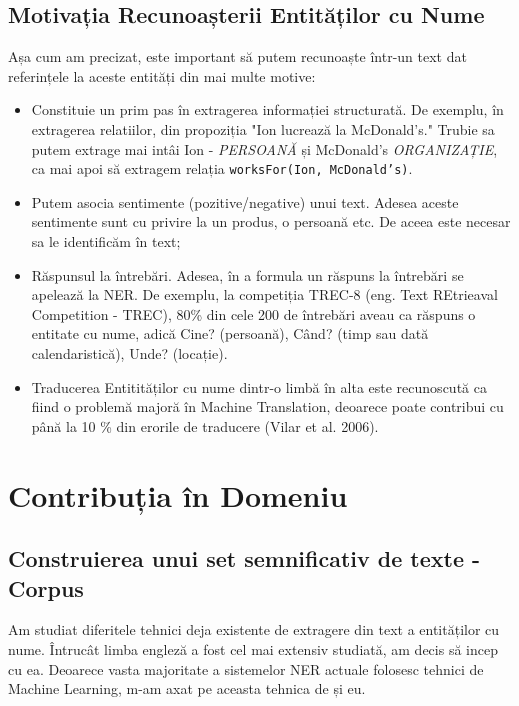 \subsection{Motivația Recunoașterii Entităților cu Nume}

Așa cum am precizat, este important să putem recunoaște într-un text dat referințele la aceste entități din mai multe motive:

\begin{itemize}
\item Constituie un prim pas în extragerea informației structurată. De exemplu, în extragerea relatiilor, din propoziția "Ion lucrează la McDonald's." Trubie sa putem extrage mai intâi Ion - \textit{PERSOANĂ} și McDonald's \textit{ORGANIZAȚIE}, ca mai apoi să extragem relația \texttt{worksFor(Ion, McDonald's)}.
\item Putem asocia sentimente (pozitive/negative) unui text. Adesea aceste sentimente sunt cu privire la un produs, o persoană etc. De aceea este necesar sa le identificăm în text;
\item Răspunsul la întrebări. Adesea, în a formula un răspuns la întrebări se apelează la NER. De exemplu, la competiția TREC-8 (eng. Text REtrieaval Competition - TREC), 80\% din cele 200 de întrebări aveau ca răspuns o entitate cu nume, adică Cine? (persoană), Când? (timp sau dată calendaristică), Unde? (locație).\cite{trec8}
\item Traducerea Entitităților cu nume dintr-o limbă în alta este recunoscută ca fiind o problemă majoră în Machine Translation, deoarece poate contribui cu până la 10 \% din erorile de traducere (Vilar et al. 2006).\cite{vilar2006}
\end{itemize}

\section{Contribuția în Domeniu}
\label{sec:contribution}

\subsection{Construierea unui set semnificativ de texte - Corpus}
\label{sub-sec:corpus-building}

Am studiat diferitele tehnici deja existente de extragere din text a entităților cu nume. Întrucât limba engleză a fost cel mai extensiv studiată, am decis să incep cu ea. Deoarece vasta majoritate a sistemelor NER actuale folosesc tehnici de Machine Learning, m-am axat pe aceasta tehnica de și eu.

